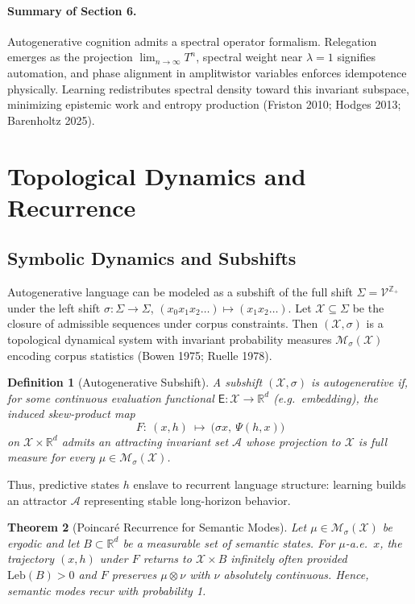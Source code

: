 \documentclass[12pt,a4paper,twoside,openright]{book}
\newtheorem{theorem}{Theorem}
\newtheorem{definition}[theorem]{Definition}
\begin{document}
\paragraph{Summary of Section 6.}
Autogenerative cognition admits a spectral operator formalism.
Relegation emerges as the projection $\lim_{n\to\infty}T^n$, spectral weight near $\lambda=1$ signifies automation, and phase alignment in amplitwistor variables enforces idempotence physically.
Learning redistributes spectral density toward this invariant subspace, minimizing epistemic work and entropy production (Friston 2010; Hodges 2013; Barenholtz 2025).

\section{Topological Dynamics and Recurrence}
\subsection{Symbolic Dynamics and Subshifts}
Autogenerative language can be modeled as a subshift of the full shift $\Sigma=\mathcal{V}^{\mathbb{Z}_+}$ under the left shift $\sigma:\Sigma\to\Sigma$, $(x_0x_1x_2\ldots)\mapsto(x_1x_2\ldots)$.
Let $\mathcal{X}\subseteq \Sigma$ be the closure of admissible sequences under corpus constraints.
Then $(\mathcal{X},\sigma)$ is a topological dynamical system with invariant probability measures $\mathcal{M}_\sigma(\mathcal{X})$ encoding corpus statistics (Bowen 1975; Ruelle 1978).

\begin{definition}[Autogenerative Subshift]
A subshift $(\mathcal{X},\sigma)$ is \emph{autogenerative} if, for some continuous evaluation functional $\mathsf{E}:\mathcal{X}\to\mathbb{R}^d$ (e.g.\ embedding), the induced skew-product map
\[
F:\ (x,h)\ \mapsto\ \big(\sigma x,\ \Psi(h,x)\big)
\]
on $\mathcal{X}\times \mathbb{R}^d$ admits an attracting invariant set $\mathcal{A}$ whose projection to $\mathcal{X}$ is full measure for every $\mu\in\mathcal{M}_\sigma(\mathcal{X})$.
\end{definition}
Thus, predictive states $h$ enslave to recurrent language structure: learning builds an attractor $\mathcal{A}$ representing stable long-horizon behavior.

\begin{theorem}[Poincaré Recurrence for Semantic Modes]
Let $\mu\in\mathcal{M}_\sigma(\mathcal{X})$ be ergodic and let $B\subset\mathbb{R}^d$ be a measurable set of semantic states.
For $\mu$-a.e.\ $x$, the trajectory $(x,h)$ under $F$ returns to $\mathcal{X}\times B$ infinitely often provided $\mathrm{Leb}(B)>0$ and $F$ preserves $\mu\otimes \nu$ with $\nu$ absolutely continuous.
Hence, semantic modes recur with probability 1.
\end{theorem}
\end{document}
